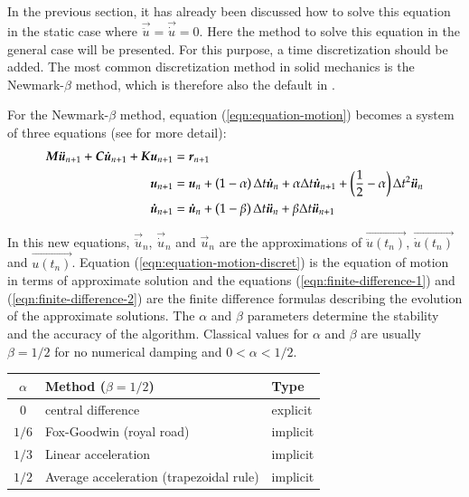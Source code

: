 In  the previous  section,  it has  already  been discussed  how  to solve  this
equation in  the static case where  $\vec{\ddot{u}} = \vec{\dot{u}}  = 0$.  Here
the method  to solve this equation in  the general case will  be presented.  For
this  purpose,  a  time  discretization   should  be  added.   The  most  common
discretization method in solid mechanics is the Newmark-$\beta$ method, which is
therefore also the default in \akantu.

For the  Newmark-$\beta$ method, equation  (\ref{eqn:equation-motion}) becomes a
system  of three  equations  (see \cite{curnier92a}  \cite{hughes-83a} for  more
detail):
\begin{align}
  \boldsymbol{M}   \boldsymbol{\ddot{u}}_{n+1}  +   \boldsymbol{C}   \boldsymbol{\dot{u}}_{n+1}  +   \boldsymbol{K}
  \boldsymbol{u}_{n+1} &= \boldsymbol{r}_{n+1} \label{eqn:equation-motion-discret} \\
  \boldsymbol{u}_{n+1}   &=   \boldsymbol{u}_{n}   +   \left(1  -   \alpha\right)   \Delta   t
  \boldsymbol{\dot{u}}_{n} + \alpha \Delta  t \boldsymbol{\dot{u}}_{n+1} + \left(\frac{1}{2} -
    \alpha\right) \Delta t^2 \boldsymbol{\ddot{u}}_{n} \label{eqn:finite-difference-1}\\
  \boldsymbol{\dot{u}}_{n+1}  &= \boldsymbol{\dot{u}}_{n}  + \left(1  - \beta\right)  \Delta t
  \boldsymbol{\ddot{u}}_{n}            +            \beta           \Delta            t
  \boldsymbol{\ddot{u}}_{n+1} \label{eqn:finite-difference-2}
\end{align}

In   this   new   equations,   $\vec{\ddot{u}}_{n}$,   $\vec{\dot{u}}_{n}$   and
$\vec{u}_{n}$     are    the     approximations     of    $\vec{\ddot{u}(t_n)}$,
$\vec{\dot{u}(t_n)}$           and           $\vec{u(t_n)}$.            Equation
(\ref{eqn:equation-motion-discret})  is  the  equation  of motion  in  terms  of
approximate  solution  and  the  equations  (\ref{eqn:finite-difference-1})  and
(\ref{eqn:finite-difference-2})  are the  finite difference  formulas describing
the evolution of the approximate solutions.  The $\alpha$ and $\beta$ parameters
determine the stability and the  accuracy of the algorithm. Classical values for
$\alpha$ and $\beta$ are usually $\beta = 1/2$ for no numerical damping and $0 <
\alpha < 1/2$.

\begin{center}
  \begin{tabular}{cll}
    \toprule
    $\alpha$ & Method ($\beta = 1/2$) & Type\\
    \midrule
    $0$ & central difference & explicit\\
    $1/6$ & Fox-Goodwin (royal road) &implicit\\
    $1/3$ & Linear acceleration &implicit\\
    $1/2$ & Average acceleration (trapezoidal rule)& implicit\\
    \bottomrule
  \end{tabular}
\end{center}

